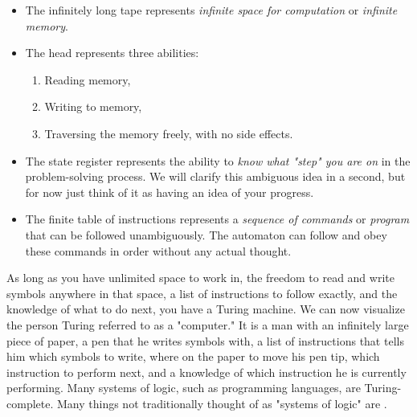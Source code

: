 \begin{itemize}
	\item The infinitely long tape represents \textit{infinite space for computation} or \textit{infinite memory}.
	\item The head represents three abilities:
		\begin{enumerate}
			\item Reading memory,
			\item Writing to memory,
			\item Traversing the memory freely, with no side effects.
		\end{enumerate}
	\item The state register represents the ability to \textit{know what "step" you are on} in the problem-solving process. We will clarify this ambiguous idea in a second, but for now just think of it as having an idea of your progress.
	\item The finite table of instructions represents a \textit{sequence of commands} or \textit{program} that can be followed unambiguously. The automaton can follow and obey these commands in order without any actual thought.
\end{itemize}

As long as you have unlimited space to work in, the freedom to read and write symbols anywhere in that space, a list of instructions to follow exactly, and the knowledge of what to do next, you have a Turing machine. We can now visualize the person Turing referred to as a "computer." It is a man with an infinitely large piece of paper, a pen that he writes symbols with, a list of instructions that tells him which symbols to write, where on the paper to move his pen tip, which instruction to perform next, and a knowledge of which instruction he is currently performing. Many systems of logic, such as programming languages, are Turing-complete. Many things not traditionally thought of as "systems of logic" are . \\\\

